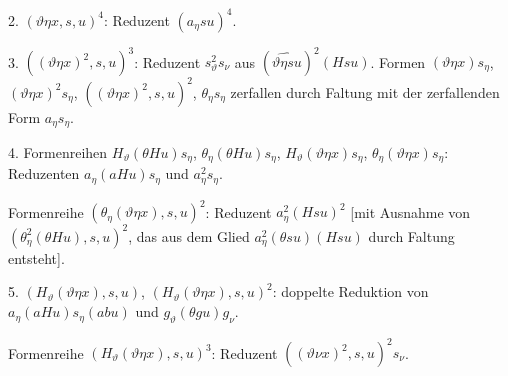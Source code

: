 \documentclass[11pt]{article}
\begin{document}
2. $(\vartheta\eta x,s,u)^4$: Reduzent $(a_\eta su)^4$.

3. $((\vartheta\eta x)^2,s,u)^3$: Reduzent $s_\vartheta^2s_\nu$ aus $(\widehat{\vartheta\eta su})^2(Hsu)$. Formen $(\vartheta\eta x)s_\eta$, $(\vartheta\eta x)^2s_\eta$, $((\vartheta\eta x)^2,s,u)^2$, $\theta_\eta s_\eta$ zerfallen durch Faltung mit der zerfallenden Form $a_\eta s_\eta$.

4. Formenreihen $H_\vartheta(\theta Hu)s_\eta$, $\theta_\eta(\theta Hu)s_\eta$, $H_\vartheta(\vartheta\eta x)s_\eta$, $\theta_\eta(\vartheta\eta x)s_\eta$: Reduzenten $a_\eta(aHu)s_\eta$ und $a_\eta^2s_\eta$.

Formenreihe $(\theta_\eta(\vartheta\eta x),s,u)^2$: Reduzent $a_\eta^2(Hsu)^2$ [mit Ausnahme von $(\theta_\eta^2(\theta Hu),s,u)^2$, das aus dem Glied $a_\eta^2(\theta su)(Hsu)$ durch Faltung entsteht].

5. $(H_\vartheta(\vartheta\eta x),s,u)$, $(H_\vartheta(\vartheta\eta x),s,u)^2$: doppelte Reduktion von $a_\eta(aHu)s_\eta(abu)$ und $g_\vartheta(\theta gu)g_\nu$.

Formenreihe $(H_\vartheta(\vartheta\eta x),s,u)^3$: Reduzent $((\vartheta\nu x)^2,s,u)^2s_\nu$.
\end{document}
